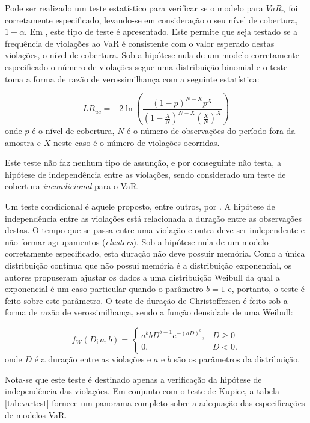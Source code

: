 \documentclass[1p]{elsarticle}
\theoremstyle{definition}
\begin{document}
Pode ser realizado um teste estatístico para verificar se o modelo para $VaR_\alpha$ foi corretamente especificado, levando-se em consideração o seu nível de cobertura, $1-\alpha$. Em \cite{Kupiec1995}, este tipo de teste é apresentado. Este permite que seja testado se a frequência de violações ao VaR é consistente com o valor esperado destas violações, o nível de cobertura. Sob a hipótese nula de um modelo corretamente especificado o número de violações segue uma distribuição binomial e o teste toma a forma de razão de verossimilhança com a seguinte estatística:

\begin{equation}
	LR_{uc}=-2\ln\left(\frac{(1-p)^{N-X}p^X}{(1-\frac{X}{N})^{N-X}(\frac{X}{N})^X}\right)
\end{equation}
onde $p$ é o nível de cobertura, $N$ é o número de observações do período fora da amostra e $X$ neste caso é o número de violações ocorridas.

Este teste não faz nenhum tipo de assunção, e por conseguinte não testa, a hipótese de independência entre as violações, sendo considerado um teste de cobertura \emph{incondicional} para o VaR.

Um teste condicional é aquele proposto, entre outros, por \cite{Christoffersen2004}. A hipótese de independência entre as violações está relacionada a duração entre as observações destas. O tempo que se passa entre uma violação e outra deve ser independente e não formar agrupamentos (\emph{clusters}). Sob a hipótese nula de um modelo corretamente especificado, esta duração não deve possuir memória. Como a única distribuição contínua que não possui memória é a distribuição exponencial, os autores propuseram ajustar os dados a uma distribuição Weibull da qual a exponencial é um caso particular quando o parâmetro $b=1$ e, portanto, o teste é feito sobre este parâmetro. O teste de duração de Christoffersen é feito sob a forma de razão de verossimilhança, sendo a função densidade de uma Weibull:

\begin{equation}
	f_W(D; a, b) = \begin{cases}
	a^b b D^{b-1}e^{-(aD)^b}, &D \geq 0\\
	0,&D<0.
	\end{cases} 
\end{equation}
onde $D$ é a duração entre as violações e $a$ e $b$ são os parâmetros da distribuição.

Nota-se que este teste é destinado apenas a verificação da hipótese de independência das violações. Em conjunto com o teste de Kupiec, a tabela \ref{tab:vartest} fornece um panorama completo sobre a adequação das especificações de modelos VaR.
\end{document}
